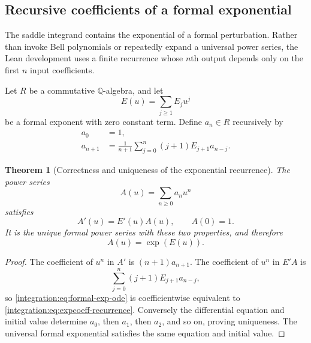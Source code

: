 \documentclass[11pt,oneside]{article}
\newtheorem{theorem}{Theorem}[section]
\theoremstyle{definition}
\theoremstyle{remark}
\newcommand{\Q}{\mathbb Q}
\begin{document}
\subsection{Recursive coefficients of a formal exponential}
\label{integration:sec:exp-coeff}

The saddle integrand contains the exponential of a formal perturbation.  Rather than invoke
Bell polynomials or repeatedly expand a universal power series, the Lean development uses a
finite recurrence whose $n$th output depends only on the first $n$ input coefficients.

Let $R$ be a commutative $\Q$-algebra, and let
\begin{equation}
 E(u)=\sum_{j\ge1}E_j u^j
 \label{integration:eq:formal-exponent}
\end{equation}
be a formal exponent with zero constant term.  Define $a_n\in R$ recursively by
\begin{align}
 a_0&=1,                                                    \label{integration:eq:expcoeff-zero}\\
 a_{n+1}&=\frac1{n+1}\sum_{j=0}^{n}(j+1)E_{j+1}a_{n-j}.
                                                               \label{integration:eq:expcoeff-recurrence}
\end{align}

\begin{theorem}[Correctness and uniqueness of the exponential recurrence]
\label{integration:thm:expcoeff-correctness}
The power series
\begin{equation}
 A(u)=\sum_{n\ge0}a_nu^n
 \label{integration:eq:formal-mass-series}
\end{equation}
satisfies
\begin{equation}
 A'(u)=E'(u)A(u),
 \qquad
 A(0)=1.
 \label{integration:eq:formal-exp-ode}
\end{equation}
It is the unique formal power series with these two properties, and therefore
\begin{equation}
 A(u)=\exp(E(u)).
 \label{integration:eq:formal-exp-identification}
\end{equation}
\end{theorem}

\begin{proof}
The coefficient of $u^n$ in $A'$ is $(n+1)a_{n+1}$.  The coefficient of $u^n$ in $E'A$ is
\[
 \sum_{j=0}^{n}(j+1)E_{j+1}a_{n-j},
\]
so \eqref{integration:eq:formal-exp-ode} is coefficientwise equivalent to
\eqref{integration:eq:expcoeff-recurrence}.  Conversely the differential equation and initial value
determine $a_0$, then $a_1$, then $a_2$, and so on, proving uniqueness.  The universal
formal exponential satisfies the same equation and initial value.
\end{proof}
\end{document}
